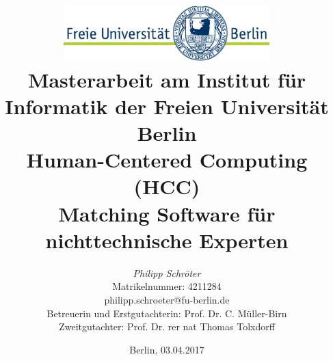 %
\begin{titlepage}

\title{\includegraphics[width=0.6\textwidth]{pics/FU_logo.pdf}\\
{\small Masterarbeit am Institut für Informatik der Freien Universität Berlin}\\
{\small Human-Centered Computing (HCC)}\\
[6ex]
{\LARGEOntologie Matching Software für nichttechnische Experten}}

\author{
{\emph{\normalsize Philipp Schröter}}\\
{\normalsize Matrikelnummer: 4211284}\\
{\normalsize philipp.schroeter@fu-berlin.de}\\
[18ex]
{\normalsize Betreuerin und Erstgutachterin: Prof. Dr. C. Müller-Birn} \\
{\normalsize Zweitgutachter: Prof. Dr. rer nat Thomas Tolxdorff}
}
\vspace{6ex}
\date{\normalsize Berlin, 03.04.2017}

\maketitle
\end{titlepage}